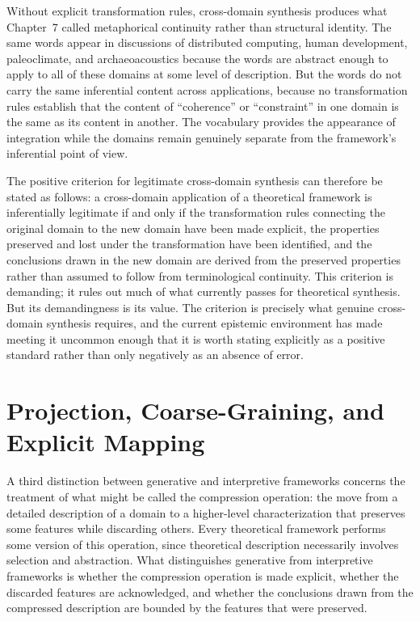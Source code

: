 \documentclass[12pt, openright, twoside]{book}
\begin{document}
Without explicit transformation rules, cross-domain synthesis produces
what Chapter~7 called metaphorical continuity rather than structural identity.
The same words appear in discussions of distributed computing, human
development, paleoclimate, and archaeoacoustics because the words are
abstract enough to apply to all of these domains at some level of description.
But the words do not carry the same inferential content across applications,
because no transformation rules establish that the content of ``coherence''
or ``constraint'' in one domain is the same as its content in another. The
vocabulary provides the appearance of integration while the domains remain
genuinely separate from the framework's inferential point of view.

The positive criterion for legitimate cross-domain synthesis can therefore
be stated as follows: a cross-domain application of a theoretical framework
is inferentially legitimate if and only if the transformation rules connecting
the original domain to the new domain have been made explicit, the properties
preserved and lost under the transformation have been identified, and the
conclusions drawn in the new domain are derived from the preserved properties
rather than assumed to follow from terminological continuity. This criterion
is demanding; it rules out much of what currently passes for theoretical
synthesis. But its demandingness is its value. The criterion is precisely
what genuine cross-domain synthesis requires, and the current epistemic
environment has made meeting it uncommon enough that it is worth stating
explicitly as a positive standard rather than only negatively as an
absence of error.

\section{Projection, Coarse-Graining, and Explicit Mapping}

A third distinction between generative and interpretive frameworks concerns
the treatment of what might be called the compression operation: the move
from a detailed description of a domain to a higher-level characterization
that preserves some features while discarding others. Every theoretical
framework performs some version of this operation, since theoretical
description necessarily involves selection and abstraction. What distinguishes
generative from interpretive frameworks is whether the compression operation
is made explicit, whether the discarded features are acknowledged, and
whether the conclusions drawn from the compressed description are bounded
by the features that were preserved.
\end{document}
